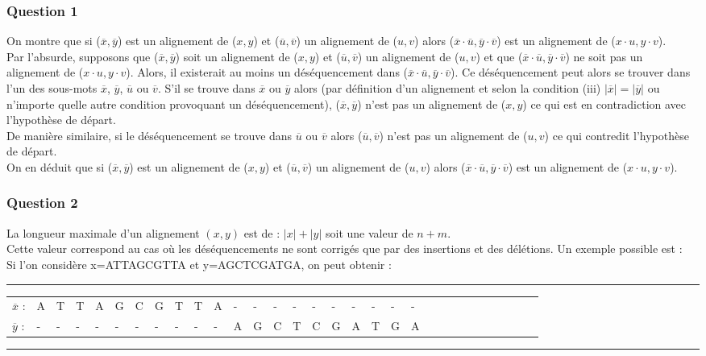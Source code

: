 \documentclass[12pt, a4paper]{report}
\begin{document}
\subsubsection{Question 1}
On montre que si ($\overline{x} ,\overline{y}$) est un alignement de ($x,y$) et ($\overline{u},\overline{v}$) un alignement de ($u,v$) alors ($\overline{x}\cdot \overline{u},\overline{y} \cdot \overline{v}$) est un alignement de ($x\cdot u,y\cdot v$).\\
Par l'absurde, supposons que ($\overline{x} ,\overline{y}$) soit un alignement de ($x,y$) et ($\overline{u},\overline{v}$) un alignement de ($u,v$) et que ($\overline{x}\cdot \overline{u},\overline{y} \cdot \overline{v}$) ne soit pas un alignement de ($x\cdot u,y\cdot v$). Alors, il existerait au moins un déséquencement dans ($\overline{x}\cdot \overline{u},\overline{y} \cdot \overline{v}$). Ce déséquencement peut alors se trouver dans l'un des sous-mots $\overline{x}$, $\overline{y}$, $\overline{u}$ ou $\overline{v}$. S'il se trouve dans $\overline{x}$ ou $\overline{y}$ alors (par définition d'un alignement et selon la condition (iii) $|\overline{x}|=|\overline{y}|$ ou n'importe quelle autre condition provoquant un déséquencement),  ($\overline{x} ,\overline{y}$) n'est pas un alignement de ($x,y$) ce qui est en contradiction avec l'hypothèse de départ.\\
De manière similaire, si le déséquencement se trouve dans $\overline{u}$ ou $\overline{v}$ alors ($\overline{u},\overline{v}$) n'est pas un alignement de ($u,v$) ce qui contredit l'hypothèse de départ.\\
On en déduit que si ($\overline{x} ,\overline{y}$) est un alignement de ($x,y$) et ($\overline{u},\overline{v}$) un alignement de ($u,v$) alors ($\overline{x}\cdot \overline{u},\overline{y} \cdot \overline{v}$) est un alignement de ($x\cdot u,y\cdot v$).

\subsubsection{Question 2}
La longueur maximale d'un alignement $(x,y)$ est de : $|x|+|y|$ soit une valeur de $n+m$.\\
Cette valeur correspond au cas où les déséquencements ne sont corrigés que par des insertions et des délétions.
Un exemple possible est :\\
Si l'on considère x=ATTAGCGTTA et y=AGCTCGATGA, on peut obtenir :
\begin{center}
\rule{0.9\textwidth}{.4pt}
\begin{tabular}{lllllllllllllllllllllllllllllll}
$\overline{x}$ :&A&T&T&A&G&C&G&T&T&A&-&-&-&-&-&-&-&-&-&-\\
$\overline{y}$ :&-&-&-&-&-&-&-&-&-&-&A&G&C&T&C&G&A&T&G&A&\\
\end{tabular}
\rule{0.9\textwidth}{.4pt}
\end{center}
\end{document}
